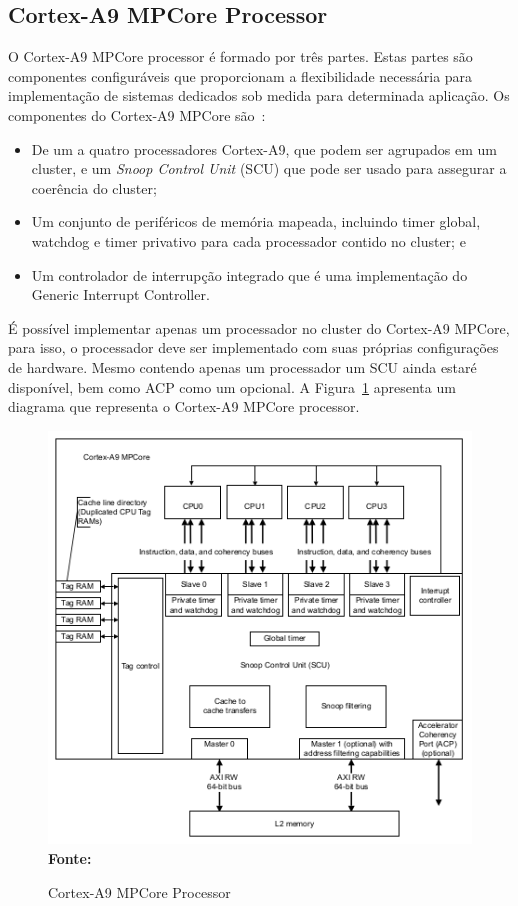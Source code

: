 \subsection{Cortex-A9 MPCore Processor}
O Cortex-A9 MPCore processor é formado por três partes. Estas partes são componentes configuráveis que proporcionam a flexibilidade necessária para implementação de sistemas dedicados sob medida para determinada aplicação. Os componentes do Cortex-A9 MPCore são~\cite{mpcore}:

\begin{itemize}
    \item De um a quatro processadores Cortex-A9, que podem ser agrupados em um cluster, e um \textit{Snoop Control Unit} (SCU) que pode ser usado para assegurar a coerência do cluster;

    \item Um conjunto de periféricos de memória mapeada, incluindo timer global, watchdog e timer privativo para cada processador contido no cluster; e
    
    \item Um controlador de interrupção integrado que é uma implementação do Generic Interrupt Controller. 
\end{itemize}

É possível implementar apenas um processador no cluster do Cortex-A9 MPCore, para isso, o processador deve ser implementado com suas próprias configurações de hardware. Mesmo contendo apenas um processador um SCU ainda estaré disponível, bem como ACP como um opcional. A Figura~\ref{fig:mpcore} apresenta um diagrama que representa o Cortex-A9 MPCore processor.

\begin{figure}[ht]
	\caption{Cortex-A9 MPCore Processor}
	\begin{center}
		\includegraphics[scale=0.7]{imagens/mpcoreA9.png}\\
		{\small \textbf{Fonte:} }
    \end{center}\label{fig:mpcore}
\end{figure}

